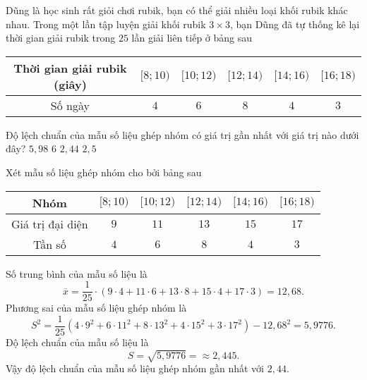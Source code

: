 \begin{ex}
	Dũng là học sinh rất giỏi chơi rubik, bạn có thể giải nhiều loại khối rubik khác nhau. Trong một lần tập luyện giải khối rubik $3\times 3$, bạn Dũng đã tự thống kê lại thời gian giải	rubik trong $25$ lần giải liên tiếp ở bảng sau
	\begin{center}
		\begin{tabular}{|c|c|c|c|c|c|}
			\hline
			Thời gian giải rubik (giây) & $[8;10)$ & $[10;12)$ & $[12;14)$ & $[14;16)$ & $[16;18)$ \\
			\hline
			Số ngày                     & $4$      & $6$       & $8$       & $4$       & $3$       \\
			\hline
		\end{tabular}
	\end{center}
	Độ lệch chuẩn của mẫu số liệu ghép nhóm có giá trị gần nhất với giá trị nào dưới đây?
	\choice
	{$5{,}98$}
	{$6$}
	{\True $2{,}44$}
	{$2{,}5$}
	\loigiai
	{
	Xét mẫu số liệu ghép nhóm cho bởi bảng sau
	\begin{center}
		\begin{tabular}{|c|c|c|c|c|c|}
			\hline
			Nhóm             & $[8;10)$ & $[10;12)$ & $[12;14)$ & $[14;16)$ & $[16;18)$ \\
			\hline
			Giá trị đại diện & $9$      & $11$      & $13$      & $15$      & $17$      \\
			\hline
			Tần số           & $4$      & $6$       & $8$       & $4$       & $3$       \\
			\hline
		\end{tabular}
	\end{center}
	Số trung bình của mẫu số liệu là
	$$\overline{x}=\dfrac{1}{25}\cdot (9\cdot 4+11\cdot 6+13\cdot 8+15\cdot 4+17\cdot 3)=12{,}68.$$
	Phương sai của mẫu số liệu ghép nhóm là
	$$S^2=\dfrac{1}{25}\left(4\cdot 9^2+6\cdot 11^2+8\cdot 13^2+4\cdot 15^2+3\cdot 17^2\right)-12{,}68^2=5{,}9776.$$
	Độ lệch chuẩn của mẫu số liệu là
	$$S=\sqrt{5{,}9776}=\approx 2{,}445.$$
	Vậy độ lệch chuẩn của mẫu số liệu ghép nhóm gần nhất với $2{,}44$.
	}
\end{ex}
